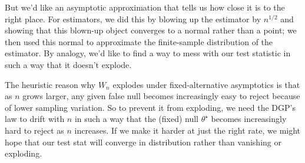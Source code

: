 \documentclass[11pt,letterpaper,reqno,oneside]{article}
\begin{document}
But we'd like an asymptotic approximation that tells us how close it is to the right place. For estimators, we did this by blowing up the estimator by $n^{1/2}$ and showing that this blown-up object converges to a normal rather than a point; we then used this normal to approximate the finite-sample distribution of the estimator. By analogy, we'd like to find a way to mess with our test statistic in such a way that it doesn't explode.

The heuristic reason why $W_n$ explodes under fixed-alternative asymptotics is that as $n$ grows larger, any given false null becomes increasingly easy to reject because of lower sampling variation. So to prevent it from exploding, we need the DGP's law to drift with $n$ in such a way that the (fixed) null $\theta^\star$ becomes increasingly hard to reject as $n$ increases. If we make it harder at just the right rate, we might hope that our test stat will converge in distribution rather than vanishing or exploding.
\end{document}
